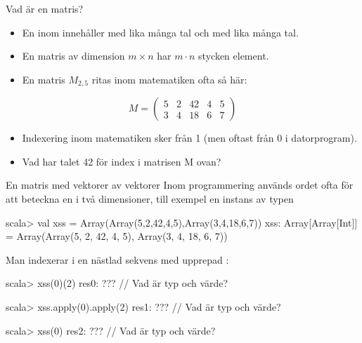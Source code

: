 \begin{Slide}{Vad är en matris?}\SlideFontSmall
\begin{multicols}{2}
\begin{itemize}
\item En  inom  innehåller  med lika många tal och  med lika många tal. 

\item En matris av dimension $m\times{}n$ har $m \cdot n$ stycken element. 

\end{itemize}

\columnbreak
\begin{itemize}
\item En matris $M_{2,5}$ ritas inom matematiken ofta så här:
\end{itemize}
\[
M=
  \begin{pmatrix}
    5 & 2 & 42 & 4 & 5 \\
    3 & 4 & 18 & 6 & 7
  \end{pmatrix}
\]

\begin{itemize}
\pause
\item Indexering inom matematiken sker från 1 (men oftast från 0 i datorprogram).

\item Vad har talet 42 för index i matrisen M ovan?
\end{itemize}
\end{multicols}
\end{Slide}

\begin{Slide}{En matris med vektorer av vektorer}
Inom programmering används ordet  ofta för att beteckna en  i två dimensioner, till exempel en instans av typen 
\begin{REPL}
scala> val xss = Array(Array(5,2,42,4,5),Array(3,4,18,6,7))
xss: Array[Array[Int]] = Array(Array(5, 2, 42, 4, 5), Array(3, 4, 18, 6, 7))
\end{REPL}
\pause
Man indexerar i en nästlad sekvens med upprepad :
\begin{REPL}
scala> xss(0)(2)
res0: ???                   // Vad är typ och värde?

scala> xss.apply(0).apply(2)
res1: ???                   // Vad är typ och värde?

scala> xss(0)
res2: ???                   // Vad är typ och värde?
\end{REPL}

\end{Slide}

